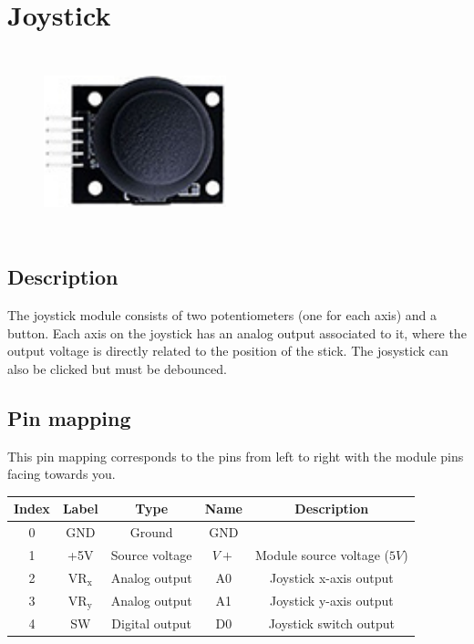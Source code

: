 \section{Joystick}
\begin{figure}[H]
    \centering
    \includegraphics[angle=0, keepaspectratio=true, scale=1, width=200px, height=200px]{images/joystick.jpg}
\end{figure}
\subsection*{Description}
The joystick module consists of two potentiometers (one for each axis) and a button. Each axis on the joystick has an analog output associated to it, where the output voltage is directly related to the position of the stick. The josystick can also be clicked but must be debounced.
\subsection*{Pin mapping}
This pin mapping corresponds to the pins from left to right with the module pins facing towards you.
\begin{table}[H]
    \centering
    \begin{tabular}{|c|c|c|c|c|}
    \hline
    Index &Label &Type &Name &Description\\ \hline
    0 &GND &Ground &GND &\\ \hline
    1 &+5V &Source voltage &$V+$ &Module source voltage ($5V$)\\ \hline
    2 &$\text{VR}_\text{x}$ &Analog output &A0 &Joystick x-axis output\\ \hline
    3 &$\text{VR}_\text{y}$ &Analog output &A1 &Joystick y-axis output\\\hline
    4 &SW &Digital output &D0 &Joystick switch output\\ \hline
    \end{tabular}
\end{table}
